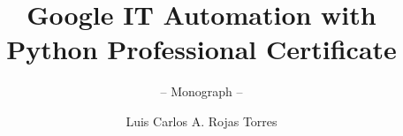 \documentclass[graybox,envcountchap,sectrefs]{svmono}
\begin{document}
\author{Luis Carlos A. Rojas Torres}
\title{Google IT Automation with Python Professional Certificate}
\subtitle{-- Monograph --}
\maketitle

\frontmatter%

%
%

%

\tableofcontents

%


\mainmatter%







\backmatter%
%
%
\printindex

\end{document}

